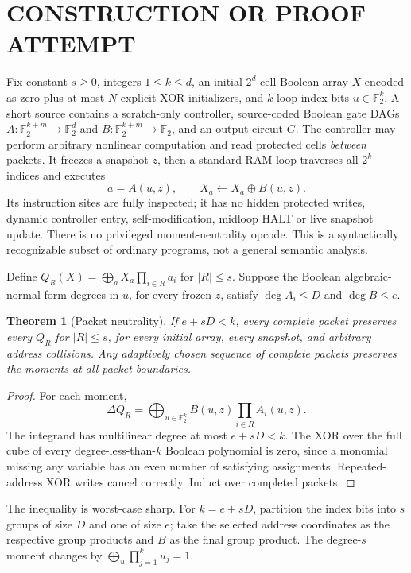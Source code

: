 \documentclass{article}
\newtheorem{theorem}{Theorem}
\begin{document}
\section{CONSTRUCTION OR PROOF ATTEMPT}
Fix constant $s\ge0$, integers $1\le k\le d$, an initial $2^d$-cell Boolean array $X$ encoded as zero plus at most $N$ explicit XOR initializers, and $k$ loop index bits $u\in\mathbb F_2^k$. A short source contains a scratch-only controller, source-coded Boolean gate DAGs
$A:\mathbb F_2^{k+m}\to\mathbb F_2^d$ and $B:\mathbb F_2^{k+m}\to\mathbb F_2$, and an output circuit $G$. The controller may perform arbitrary nonlinear computation and read protected cells \emph{between} packets. It freezes a snapshot $z$, then a standard RAM loop traverses all $2^k$ indices and executes
\[
a=A(u,z),\qquad X_a\leftarrow X_a\oplus B(u,z).
\]
Its instruction sites are fully inspected; it has no hidden protected writes, dynamic controller entry, self-modification, midloop HALT or live snapshot update. There is no privileged moment-neutrality opcode. This is a syntactically recognizable subset of ordinary programs, not a general semantic analysis.

Define $Q_R(X)=\bigoplus_a X_a \prod_{i\in R}a_i$ for $|R|\le s$. Suppose the Boolean algebraic-normal-form degrees in $u$, for every frozen $z$, satisfy $\deg A_i\le D$ and $\deg B\le e$.

\begin{theorem}[Packet neutrality]
If $e+sD<k$, every complete packet preserves every $Q_R$ for $|R|\le s$, for every initial array, every snapshot, and arbitrary address collisions. Any adaptively chosen sequence of complete packets preserves the moments at all packet boundaries.
\end{theorem}
\begin{proof}
For each moment,
\[
\Delta Q_R=\bigoplus_{u\in\mathbb F_2^k} B(u,z)\prod_{i\in R}A_i(u,z).
\]
The integrand has multilinear degree at most $e+sD<k$. The XOR over the full cube of every degree-less-than-$k$ Boolean polynomial is zero, since a monomial missing any variable has an even number of satisfying assignments. Repeated-address XOR writes cancel correctly. Induct over completed packets.
\end{proof}
The inequality is worst-case sharp. For $k=e+sD$, partition the index bits into $s$ groups of size $D$ and one of size $e$; take the selected address coordinates as the respective group products and $B$ as the final group product. The degree-$s$ moment changes by $\bigoplus_u\prod_{j=1}^k u_j=1$.
\end{document}
